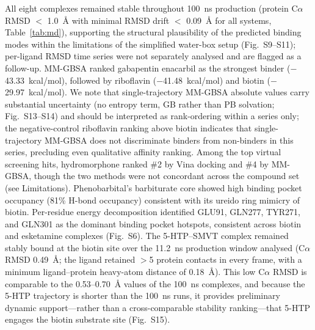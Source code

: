 \documentclass[pdflatex,sn-nature]{sn-jnl}
\begin{document}
All eight complexes remained stable throughout 100~ns production (protein C$\alpha$ RMSD $<$ 1.0~\AA{} with minimal RMSD drift $<$ 0.09~\AA{} for all systems, Table~\ref{tab:md}), supporting the structural plausibility of the predicted binding modes within the limitations of the simplified water-box setup (Fig.~S9--S11); per-ligand RMSD time series were not separately analysed and are flagged as a follow-up. MM-GBSA ranked gabapentin enacarbil as the strongest binder ($-$43.33~kcal/mol), followed by riboflavin ($-$41.48~kcal/mol) and biotin ($-$29.97~kcal/mol). We note that single-trajectory MM-GBSA absolute values carry substantial uncertainty (no entropy term, GB rather than PB solvation; Fig.~S13--S14) and should be interpreted as rank-ordering within a series only; the negative-control riboflavin ranking above biotin indicates that single-trajectory MM-GBSA does not discriminate binders from non-binders in this series, precluding even qualitative affinity ranking. Among the top virtual screening hits, hydromorphone ranked \#2 by Vina docking and \#4 by MM-GBSA, though the two methods were not concordant across the compound set (see Limitations). Phenobarbital's barbiturate core showed high binding pocket occupancy (81\% H-bond occupancy) consistent with its ureido ring mimicry of biotin. Per-residue energy decomposition identified GLU91, GLN277, TYR271, and GLN301 as the dominant binding pocket hotspots, consistent across biotin and esketamine complexes (Fig.~S6). The 5-HTP--SMVT complex remained stably bound at the biotin site over the 11.2~ns production window analysed (C$\alpha$ RMSD 0.49~\AA{}; the ligand retained $>$5 protein contacts in every frame, with a minimum ligand--protein heavy-atom distance of 0.18~\AA{}). This low C$\alpha$ RMSD is comparable to the 0.53--0.70~\AA{} values of the 100~ns complexes, and because the 5-HTP trajectory is shorter than the 100~ns runs, it provides preliminary dynamic support---rather than a cross-comparable stability ranking---that 5-HTP engages the biotin substrate site (Fig.~S15).
\end{document}
